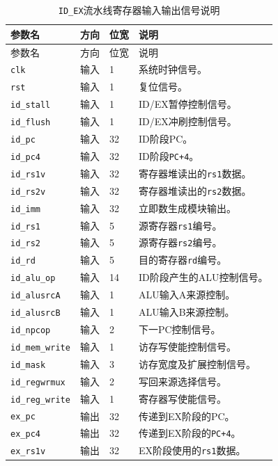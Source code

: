 \documentclass[12pt,a4paper]{ctexart}
\newcommand{\code}[1]{\texttt{#1}}
\begin{document}
{\footnotesize
\renewcommand{\arraystretch}{1.12}
\begin{longtable}{p{3.2cm}p{1.5cm}p{2.1cm}p{7.0cm}}
\caption{\code{ID\_EX}流水线寄存器输入输出信号说明}\\
\toprule
参数名 & 方向 & 位宽 & 说明 \\
\midrule
\endfirsthead
\toprule
参数名 & 方向 & 位宽 & 说明 \\
\midrule
\endhead
\code{clk} & 输入 & 1 & 系统时钟信号。 \\
\code{rst} & 输入 & 1 & 复位信号。 \\
\code{id\_stall} & 输入 & 1 & ID/EX暂停控制信号。 \\
\code{id\_flush} & 输入 & 1 & ID/EX冲刷控制信号。 \\
\code{id\_pc} & 输入 & 32 & ID阶段PC。 \\
\code{id\_pc4} & 输入 & 32 & ID阶段\code{PC+4}。 \\
\code{id\_rs1v} & 输入 & 32 & 寄存器堆读出的\code{rs1}数据。 \\
\code{id\_rs2v} & 输入 & 32 & 寄存器堆读出的\code{rs2}数据。 \\
\code{id\_imm} & 输入 & 32 & 立即数生成模块输出。 \\
\code{id\_rs1} & 输入 & 5 & 源寄存器\code{rs1}编号。 \\
\code{id\_rs2} & 输入 & 5 & 源寄存器\code{rs2}编号。 \\
\code{id\_rd} & 输入 & 5 & 目的寄存器\code{rd}编号。 \\
\code{id\_alu\_op} & 输入 & 14 & ID阶段产生的ALU控制信号。 \\
\code{id\_alusrcA} & 输入 & 1 & ALU输入A来源控制。 \\
\code{id\_alusrcB} & 输入 & 1 & ALU输入B来源控制。 \\
\code{id\_npcop} & 输入 & 2 & 下一PC控制信号。 \\
\code{id\_mem\_write} & 输入 & 1 & 访存写使能控制信号。 \\
\code{id\_mask} & 输入 & 3 & 访存宽度及扩展控制信号。 \\
\code{id\_regwrmux} & 输入 & 2 & 写回来源选择信号。 \\
\code{id\_reg\_write} & 输入 & 1 & 寄存器写使能信号。 \\
\code{ex\_pc} & 输出 & 32 & 传递到EX阶段的PC。 \\
\code{ex\_pc4} & 输出 & 32 & 传递到EX阶段的\code{PC+4}。 \\
\code{ex\_rs1v} & 输出 & 32 & EX阶段使用的\code{rs1}数据。 \\

\end{longtable}}
\end{document}
